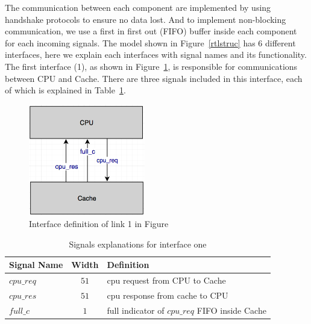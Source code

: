 \documentclass[12pt,frontmatter,copyright,thesis]{usfmanus}
\begin{document}
The communication between each component are implemented by using handshake protocols to ensure no
data lost. And to implement non-blocking communication, we use
a first in first out (FIFO) buffer inside each component for each incoming signals.
The model shown in Figure~\ref{rtlstruc} has 6 different interfaces, here we explain each interfaces
with signal names and its functionality.
The first interface (1), as shown in Figure~\ref{int1}, is responsible for communications between CPU and Cache.
There are three signals included in this interface, each of which is explained in Table~\ref{int1t}.
\begin{figure}[h]
\centering
    \includegraphics[width=2in]{int1.png}
    \caption{Interface definition of link 1 in Figure}
    \label{int1}
 \end{figure}

\begin{table}[h]
\caption{Signals explanations for interface one}

\begin{tabular}{|l|c | p{12cm} |}
\hline
Signal Name & Width & Definition \\
\hline
\hline
$cpu\_req$ 		&$51$			& cpu request from CPU to Cache \\
\hline
$cpu\_res$ 		&$51$			& cpu response from cache to CPU \\
\hline
$full\_c$ 			&$1$				& full indicator of $cpu\_req$ FIFO inside Cache\\
\hline
\end{tabular}
\label{int1t}
\end{table}
\end{document}
